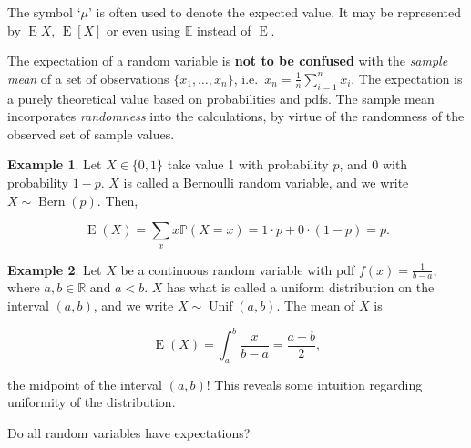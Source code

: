 \documentclass[
]{book}
\DeclareMathOperator{\E}{E}
\DeclareMathOperator{\Bern}{Bern}
\DeclareMathOperator{\Unif}{Unif}
\newcommand{\bbR}{\mathbb{R}}
\newcommand{\bbP}{\mathbb{P}}
\newcommand{\bbE}{\mathbb{E}}
\theoremstyle{definition}
\theoremstyle{definition}
\newtheorem{example}{Example}[chapter]
\theoremstyle{definition}
\theoremstyle{definition}
\theoremstyle{remark}
\begin{document}
The symbol `\(\mu\)' is often used to denote the expected value. It may be represented by \(\E X\), \(\E[X]\) or even using \(\bbE\) instead of \(\E\).

The expectation of a random variable is \textbf{not to be confused} with the \emph{sample mean} of a set of observations \(\{x_1,\dots,x_n \}\), i.e.~\(\bar x_n = \frac{1}{n} \sum_{i=1}^n x_i\).
The expectation is a purely theoretical value based on probabilities and pdfs.
The sample mean incorporates \emph{randomness} into the calculations, by virtue of the randomness of the observed set of sample values.

\begin{example}
Let \(X \in \{0,1\}\) take value 1 with probability \(p\), and 0 with probability \(1-p\).
\(X\) is called a Bernoulli random variable, and we write \(X \sim \Bern(p)\).
Then,

\[
\E(X) = \sum_x x\bbP(X = x) = 1\cdot p + 0 \cdot (1-p) = p.
\]
\end{example}

\begin{example}
Let \(X\) be a continuous random variable with pdf \(f(x)=\frac{1}{b-a}\), where \(a,b\in\bbR\) and \(a<b\).
\(X\) has what is called a uniform distribution on the interval \((a,b)\), and we write \(X\sim\Unif(a,b)\). The mean of \(X\) is

\[
\E(X) = \int_a^b  \frac{x}{b-a} = \frac{a+b}{2},
\]

the midpoint of the interval \((a,b)\)! This reveals some intuition regarding uniformity of the distribution.
\end{example}

Do all random variables have expectations?
\end{document}
